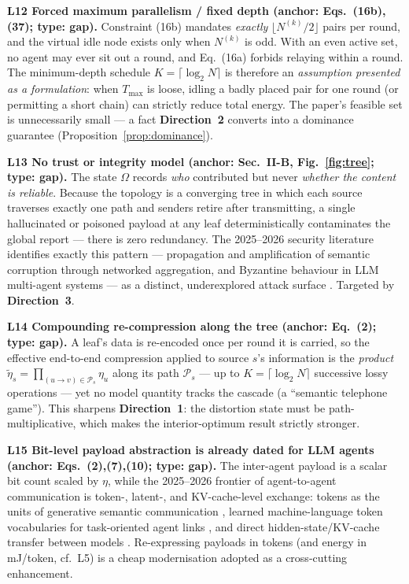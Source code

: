 \documentclass[11pt,a4paper]{article}
\newcommand{\Ltag}[1]{\textcolor{brick}{\textbf{#1}}}
\newcommand{\Dir}[1]{\textcolor{accent}{\textbf{Direction~#1}}}
\begin{document}
\textbf{\Ltag{L12} Forced maximum parallelism / fixed depth (anchor: Eqs.~(16b), (37); type: gap).} Constraint (16b) mandates \emph{exactly} $\lfloor N^{(k)}/2\rfloor$ pairs per round, and the virtual idle node exists only when $N^{(k)}$ is odd. With an even active set, no agent may ever sit out a round, and Eq.~(16a) forbids relaying within a round. The minimum-depth schedule $K=\lceil\log_2 N\rceil$ is therefore an \emph{assumption presented as a formulation}: when $T_{\max}$ is loose, idling a badly placed pair for one round (or permitting a short chain) can strictly reduce total energy. The paper's feasible set is unnecessarily small --- a fact \Dir{2} converts into a dominance guarantee (Proposition~\ref{prop:dominance}).

\textbf{\Ltag{L13} No trust or integrity model (anchor: Sec.~II-B, Fig.~\ref{fig:tree}; type: gap).} The state $\Omega$ records \emph{who} contributed but never \emph{whether the content is reliable}. Because the topology is a converging tree in which each source traverses exactly one path and senders retire after transmitting, a single hallucinated or poisoned payload at any leaf deterministically contaminates the global report --- there is zero redundancy. The 2025--2026 security literature identifies exactly this pattern --- propagation and amplification of semantic corruption through networked aggregation, and Byzantine behaviour in LLM multi-agent systems --- as a distinct, underexplored attack surface \cite{securesemcom,sacbyz,decentllm}. Targeted by \Dir{3}.

\textbf{\Ltag{L14} Compounding re-compression along the tree (anchor: Eq.~(2); type: gap).} A leaf's data is re-encoded once per round it is carried, so the effective end-to-end compression applied to source $s$'s information is the \emph{product} $\tilde\eta_s=\prod_{(u\to v)\in\mathcal P_s}\eta_u$ along its path $\mathcal P_s$ --- up to $K=\lceil\log_2 N\rceil$ successive lossy operations --- yet no model quantity tracks the cascade (a ``semantic telephone game''). This sharpens \Dir{1}: the distortion state must be path-multiplicative, which makes the interior-optimum result strictly stronger.

\textbf{\Ltag{L15} Bit-level payload abstraction is already dated for LLM agents (anchor: Eqs.~(2),(7),(10); type: gap).} The inter-agent payload is a scalar bit count scaled by $\eta$, while the 2025--2026 frontier of agent-to-agent communication is token-, latent-, and KV-cache-level exchange: tokens as the units of generative semantic communication \cite{tokcom}, learned machine-language token vocabularies for task-oriented agent links \cite{mltok}, and direct hidden-state/KV-cache transfer between models \cite{c2c,latentsurvey}. Re-expressing payloads in tokens (and energy in mJ/token, cf.\ L5) is a cheap modernisation adopted as a cross-cutting enhancement.
\end{document}

